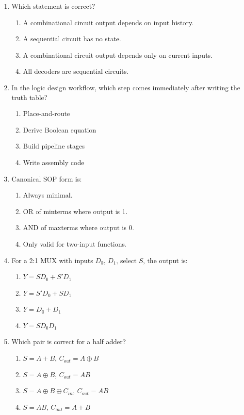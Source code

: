 \documentclass[11pt]{article}
\begin{document}
\begin{enumerate}[label=\textbf{A\arabic*.}]
  \item Which statement is correct?
  \begin{enumerate}[label=(\Alph*)]
    \item A combinational circuit output depends on input history.
    \item A sequential circuit has no state.
    \item A combinational circuit output depends only on current inputs.
    \item All decoders are sequential circuits.
  \end{enumerate}

  \item In the logic design workflow, which step comes immediately after writing the truth table?
  \begin{enumerate}[label=(\Alph*)]
    \item Place-and-route
    \item Derive Boolean equation
    \item Build pipeline stages
    \item Write assembly code
  \end{enumerate}

  \item Canonical SOP form is:
  \begin{enumerate}[label=(\Alph*)]
    \item Always minimal.
    \item OR of minterms where output is 1.
    \item AND of maxterms where output is 0.
    \item Only valid for two-input functions.
  \end{enumerate}

  \item For a 2:1 MUX with inputs $D_0$, $D_1$, select $S$, the output is:
  \begin{enumerate}[label=(\Alph*)]
    \item $Y = SD_0 + S'D_1$
    \item $Y = S'D_0 + SD_1$
    \item $Y = D_0 + D_1$
    \item $Y = SD_0D_1$
  \end{enumerate}

  \item Which pair is correct for a half adder?
  \begin{enumerate}[label=(\Alph*)]
    \item $S=A+B$, $C_{out}=A\oplus B$
    \item $S=A\oplus B$, $C_{out}=AB$
    \item $S=A\oplus B\oplus C_{in}$, $C_{out}=AB$
    \item $S=AB$, $C_{out}=A+B$
  \end{enumerate}


\end{enumerate}
\end{document}

